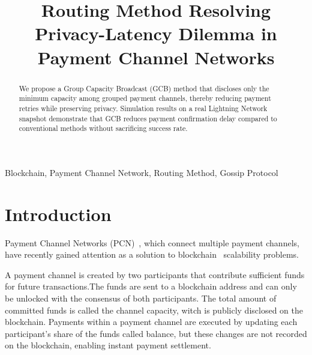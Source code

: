 \documentclass[conference]{IEEEtran}
\begin{document}
\title{Routing Method Resolving Privacy-Latency Dilemma in Payment Channel Networks}

\author{
	\and
}

\maketitle

\begin{abstract}
	We propose a Group Capacity Broadcast (GCB) method that discloses only the minimum capacity among grouped payment channels, thereby reducing payment retries while preserving privacy.
	Simulation results on a real Lightning Network snapshot demonstrate that GCB reduces payment confirmation delay compared to conventional methods without sacrificing success rate.
\end{abstract}

\begin{IEEEkeywords}
	Blockchain, Payment Channel Network, Routing Method, Gossip Protocol
\end{IEEEkeywords}

\section{Introduction}

Payment Channel Networks (PCN)~\cite{poon_dryja_2016}, which connect multiple payment channels, have recently gained attention as a solution to blockchain~\cite{nakamoto2008bitcoin} scalability problems.

A payment channel is created by two participants that contribute sufficient funds for future transactions.The funds are sent to a blockchain address and can only be unlocked with the consensus of both participants.
The total amount of committed funds is called the channel capacity, witch is publicly disclosed on the blockchain.
Payments within a payment channel are executed by updating each participant's share of the funds called balance, but these changes are not recorded on the blockchain, enabling instant payment settlement.
\end{document}
